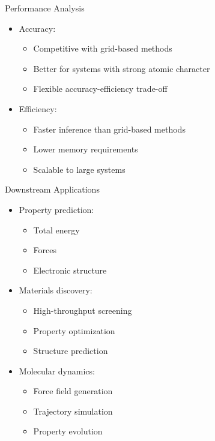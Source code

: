 \begin{frame}{Performance Analysis}
    \begin{itemize}
        \item Accuracy:
        \begin{itemize}
            \item Competitive with grid-based methods
            \item Better for systems with strong atomic character
            \item Flexible accuracy-efficiency trade-off
        \end{itemize}
        \item Efficiency:
        \begin{itemize}
            \item Faster inference than grid-based methods
            \item Lower memory requirements
            \item Scalable to large systems
        \end{itemize}
    \end{itemize}
\end{frame}

\begin{frame}{Downstream Applications}
    \begin{itemize}
        \item Property prediction:
        \begin{itemize}
            \item Total energy
            \item Forces
            \item Electronic structure
        \end{itemize}
        \item Materials discovery:
        \begin{itemize}
            \item High-throughput screening
            \item Property optimization
            \item Structure prediction
        \end{itemize}
        \item Molecular dynamics:
        \begin{itemize}
            \item Force field generation
            \item Trajectory simulation
            \item Property evolution
        \end{itemize}
    \end{itemize}
\end{frame} 